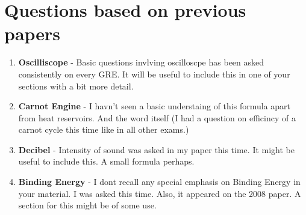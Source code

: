\documentclass{article}
\begin{document}
\section{Questions based on previous papers}
\begin{enumerate}
\item \textbf{Oscilliscope} - Basic questions invlving oscilloscpe has been asked consistently on every GRE. It will be useful to include this in one of your sections with a bit more detail.
\item \textbf{Carnot Engine} - I havn't seen a basic understaing of this formula apart from heat reservoirs. And the word itself (I had a question on efficincy of a carnot cycle this time like in all other exams.)
\item \textbf{Decibel} - Intensity of sound was asked in my paper this time. It might be useful to include this. A small formula perhaps.
\item \textbf{Binding Energy} - I dont recall any special emphasis on Binding Energy in your material. I was asked this time. Also, it appeared on the 2008 paper. A section for this might be of some use.
\end{enumerate}
\end{document}
